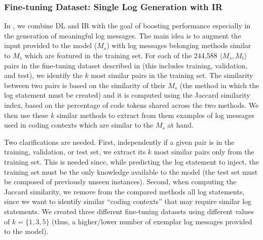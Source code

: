 \subsubsection{Fine-tuning Dataset: Single Log Generation with IR} \label{sec:single-log-plus-IR}

In \approach, we combine DL and IR with the goal of boosting performance especially in the generation of meaningful log messages. The main idea is to augment the input provided to the model (\ie $M_{s}$) with log messages belonging methods similar to $M_{s}$ which are featured in the training set. For each of the 244,588 $\langle M_s, M_t \rangle$ pairs in the fine-tuning dataset described in  (this includes training, validation, and test), we identify the $k$ most similar pairs in the training set. The similarity between two pairs is based on the similarity of their $M_s$ (\ie the method in which the log statement must be created) and it is computed using the Jaccard similarity \cite{hancock2004jaccard} index, based on the percentage of code tokens shared across the two methods. We then use these $k$ similar methods to extract from them examples of log messages used in coding contexts which are similar to the $M_s$ at hand. 

Two clarifications are needed. First, independently if a given pair is in the training, validation, or test set, we extract its $k$ most similar pairs only from the training set. This is needed since, while predicting the log statement to inject, the training set must be the only knowledge available to the model (\ie the test set must be composed of previously unseen instances). Second, when computing the Jaccard similarity, we remove from the compared methods all log statements, since we want to identify similar ``coding contexts'' that may require similar log statements. We created three different fine-tuning datasets using different values of $k=\{1,3,5\}$ (thus, a higher/lower number of exemplar log messages provided to the model).

